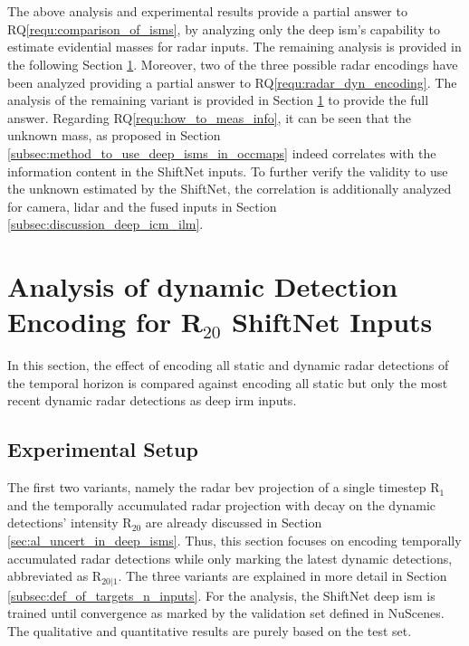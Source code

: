 \\\\
The above analysis and experimental results provide a partial answer to RQ\ref{requ:comparison_of_isms}, by analyzing only the deep \gls{ism}'s capability to estimate evidential masses for radar inputs. The remaining analysis is provided in the following Section \ref{sec:analysis_dyn_encoding}. Moreover, two of the three possible radar encodings have been analyzed providing a partial answer to RQ\ref{requ:radar_dyn_encoding}. The analysis of the remaining variant is provided in Section \ref{sec:analysis_dyn_encoding} to provide the full answer. Regarding RQ\ref{requ:how_to_meas_info}, it can be seen that the unknown mass, as proposed in Section \ref{subsec:method_to_use_deep_isms_in_occmaps} indeed correlates with the information content in the ShiftNet inputs. To further verify the validity to use the unknown estimated by the ShiftNet, the correlation is additionally analyzed for camera, lidar and the fused inputs in Section \ref{subsec:discussion_deep_icm_ilm}.
%
\section{Analysis of dynamic Detection Encoding for R$_{20}$ ShiftNet Inputs}
\label{sec:analysis_dyn_encoding}
In this section, the effect of encoding all static and dynamic radar detections of the temporal horizon is compared against encoding all static but only the most recent dynamic radar detections as deep \gls{irm} inputs. 
%
\subsection{Experimental Setup}
The first two variants, namely the radar \gls{bev} projection of a single timestep R$_1$ and the temporally accumulated radar projection with decay on the dynamic detections' intensity R$_{20}$ are already discussed in Section \ref{sec:al_uncert_in_deep_isms}. Thus, this section focuses on encoding temporally accumulated radar detections while only marking the latest dynamic detections, abbreviated as R$_{20|1}$. The three variants are explained in more detail in Section \ref{subsec:def_of_targets_n_inputs}. For the analysis, the ShiftNet deep \gls{ism} is trained until convergence as marked by the validation set defined in NuScenes. The qualitative and quantitative results are purely based on the test set.
%
